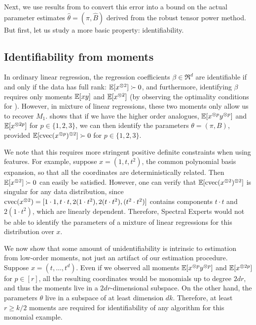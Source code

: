 Next, we use results from \citet{AnandkumarGeHsu2012} to convert this error
into a bound on the actual parameter estimates $\hat\theta = (\hat\pi, \hat B)$
derived from the robust tensor power method.
But first, let us study a more basic property: identifiability.


\subsection{Identifiability from moments}

In ordinary linear regression, the regression coefficients $\beta \in
\Re^d$ are identifiable if and only if the data has full rank:
$\operatorname{\mathbb{E}}[x^{\otimes 2}] \succ 0$, and furthermore, identifying $\beta$ requires
only moments $\operatorname{\mathbb{E}}[xy]$ and $\operatorname{\mathbb{E}}[x^{\otimes 2}]$ (by observing the optimality
conditions for ).  However, in mixture of linear regressions,
these two moments only allow us to recover $M_1$.  
shows that if we have the higher order analogues, $\operatorname{\mathbb{E}}[x^{\otimes p}y^{\otimes p}]$
and $\operatorname{\mathbb{E}}[x^{\otimes 2p}]$ for $p \in \{1,2,3\}$, we can then identify the
parameters $\theta = (\pi, B)$, provided $\operatorname{\mathbb{E}}[\operatorname{cvec}(x^{\otimes p})^{\otimes 2}] \succ
0$ for $p \in \{1,2,3\}$.

We note that this requires more stringent positive definite constraints
when using features. For example, suppose $x = (1, t, t^2)$, the common
polynomial basis expansion, so that all the coordinates are
deterministically related.  Then $\operatorname{\mathbb{E}}[x^{\otimes 2}] \succ 0$ can easily be
satisfied. 
However, one can verify that $\operatorname{\mathbb{E}}[\operatorname{cvec}(x^{\otimes 2})^{\otimes 2}]$ is singular for
any data distribution, since $\operatorname{cvec}(x^{\otimes 2}) = [1 \cdot 1, t\cdot t, 2(1
\cdot t^2), 2(t \cdot t^2), (t^2 \cdot t^2)]$ contains components $t
\cdot t$ and $2(1 \cdot t^2)$, which are linearly dependent.  Therefore,
Spectral Experts would not be able to identify the parameters of
a mixture of linear regressions for this distribution over $x$.

We now show that some amount of unidentifiability is intrinsic to
estimation from low-order moments, not just an artifact of our
estimation procedure.  Suppose $x = (t, \dots, t^d)$.  Even if we
observed all moments $\operatorname{\mathbb{E}}[x^{\otimes p}y^{\otimes p}]$ and $\operatorname{\mathbb{E}}[x^{\otimes 2p}]$ for $p \in
[r]$, all the resulting coordinates would be monomials up to degree
$2dr$, and thus the moments live in a $2dr$-dimensional subspace.  On
the other hand, the parameters $\theta$ live in a subspace of at least
dimension $dk$.  Therefore, at least $r \ge k/2$ moments are required
for identifiability of any algorithm for this monomial example.

